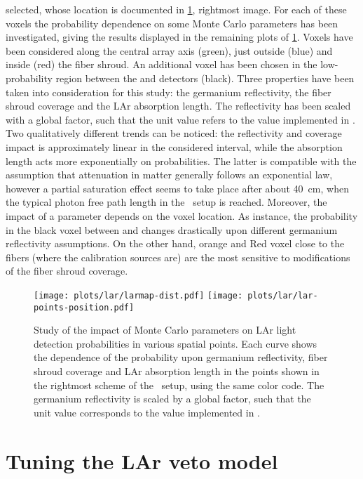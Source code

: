 selected, whose location is documented in \cref{fig:bkg:lar:ph2:larmap:dist}, rightmost
image. For each of these voxels the probability dependence on some Monte Carlo parameters
has been investigated, giving the results displayed in the remaining plots of
\cref{fig:bkg:lar:ph2:larmap:dist}. Voxels have been considered along the central array
axis (green), just outside (blue) and inside (red) the fiber shroud. An additional voxel
has been chosen in the low-probability region between the  and  detectors
(black). Three properties have been taken into consideration for this study: the germanium
reflectivity, the fiber shroud coverage and the LAr absorption length. The reflectivity
has been scaled with a global factor, such that the unit value refers to the value
implemented in \mage. Two qualitatively different trends can be noticed: the reflectivity
and coverage impact is approximately linear in the considered interval, while the
absorption length acts more exponentially on probabilities. The latter is compatible with
the assumption that attenuation in matter generally follows an exponential law, however a
partial saturation effect seems to take place after about 40~cm, when the typical photon
free path length in the \gerda\ setup is reached. Moreover, the impact of a parameter
depends on the voxel location. As instance, the probability in the black voxel between
 and  changes drastically upon different germanium reflectivity
assumptions. On the other hand, orange and Red voxel close to the fibers (where the
calibration sources are) are the most sensitive to modifications of the fiber shroud
coverage.

\begin{figure}
  \centering
  \texttt{[image: plots/lar/larmap-dist.pdf]}%
  \texttt{[image: plots/lar/lar-points-position.pdf]}
  \caption{%
    Study of the impact of Monte Carlo parameters on LAr light detection probabilities in
    various spatial points. Each curve shows the dependence of the probability upon
    germanium reflectivity, fiber shroud coverage and LAr absorption length in the points
    shown in the rightmost scheme of the \gerda\ setup, using the same color code. The
    germanium reflectivity is scaled by a global factor, such that the unit value
    corresponds to the value implemented in \mage.
  }\label{fig:bkg:lar:ph2:larmap:dist}
\end{figure}

\section{Tuning the LAr veto model}%
\label{sec:bkg:lar:ph2:pcalib}

